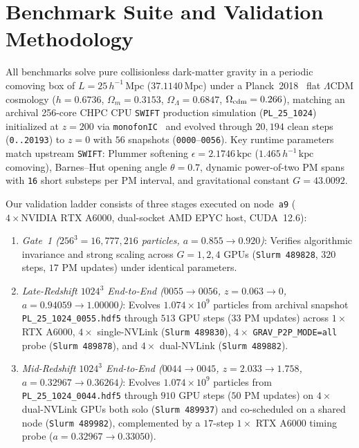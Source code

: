 \documentclass[aps,prd,reprint,superscriptaddress,nofootinbib,amsmath,amssymb,floatfix,longbibliography]{revtex4-2}
\begin{document}
\section{Benchmark Suite and Validation Methodology}\label{sec:bench}

All benchmarks solve pure collisionless dark-matter gravity in a periodic comoving box of $L = 25\,h^{-1}\,\mathrm{Mpc}$ ($37.1140\,\mathrm{Mpc}$) under a Planck~2018~\citep{Planck2018VI} flat $\Lambda$CDM cosmology ($h = 0.6736$, $\Omega_m = 0.3153$, $\Omega_\Lambda = 0.6847$, $\Omega_{\rm cdm} = 0.266$), matching an archival 256-core CHPC CPU \texttt{SWIFT} production simulation (\texttt{PL\_25\_1024}) initialized at $z = 200$ via \texttt{monofonIC}~\citep{Michaux2021monofonIC} and evolved through $20{,}194$ clean steps (\texttt{0..20193}) to $z = 0$ with $56$ snapshots (\texttt{0000}--\texttt{0056}). Key runtime parameters match upstream \texttt{SWIFT}: Plummer softening $\epsilon = 2.1746\,\mathrm{kpc}$ ($1.465\,h^{-1}\,\mathrm{kpc}$ comoving), Barnes--Hut opening angle $\theta = 0.7$, dynamic power-of-two PM spans with \texttt{16} short substeps per PM interval, and gravitational constant $G = 43.0092$.

Our validation ladder consists of three stages executed on node~\texttt{a9} ($4 \times \text{NVIDIA RTX A6000}$, dual-socket AMD EPYC host, CUDA~12.6):
\begin{enumerate}
  \item \textit{Gate~1 ($256^3 = 16{,}777{,}216$ particles, $a = 0.855 \rightarrow 0.920$)}: Verifies algorithmic invariance and strong scaling across $G = 1, 2, 4$ GPUs (\texttt{Slurm 489828}, $320$ steps, $17$ PM updates) under identical parameters.
  \item \textit{Late-Redshift $1024^3$ End-to-End ($0055 \rightarrow 0056$, $z = 0.063 \rightarrow 0$, $a = 0.94059 \rightarrow 1.00000$)}: Evolves $1.074 \times 10^9$ particles from archival snapshot \texttt{PL\_25\_1024\_0055.hdf5} through $513$ GPU steps ($33$ PM updates) across $1\times$ RTX A6000, $4\times$ single-NVLink (\texttt{Slurm 489830}), $4\times$ \texttt{GRAV\_P2P\_MODE=all} probe (\texttt{Slurm 489878}), and $4\times$ dual-NVLink (\texttt{Slurm 489882}).
  \item \textit{Mid-Redshift $1024^3$ End-to-End ($0044 \rightarrow 0045$, $z = 2.033 \rightarrow 1.758$, $a = 0.32967 \rightarrow 0.36264$)}: Evolves $1.074 \times 10^9$ particles from \texttt{PL\_25\_1024\_0044.hdf5} through $910$ GPU steps ($50$ PM updates) on $4\times$ dual-NVLink GPUs both solo (\texttt{Slurm 489937}) and co-scheduled on a shared node (\texttt{Slurm 489982}), complemented by a $17$-step $1\times$ RTX A6000 timing probe ($a = 0.32967 \rightarrow 0.33050$).
\end{enumerate}
\end{document}
